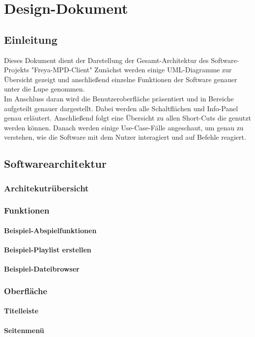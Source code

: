 \chapter{Design-Dokument}
\section{Einleitung}
Dieses Dokument dient der Darstellung der Gesamt-Architektur des Software-Projekts "Freya-MPD-Client"
Zunächst werden einige UML-Diagramme zur Übersicht gezeigt und anschließend einzelne Funktionen der
Software genauer unter die Lupe genommen.\ \\
Im Anschluss daran wird die Benutzeroberfläche präsentiert und in Bereiche aufgeteilt genauer dargestellt.
Dabei werden alle Schaltflächen und Info-Panel genau erläutert.
Anschließend folgt eine Übersicht zu allen Short-Cuts die genutzt werden können.
Danach werden einige Use-Case-Fälle angeschaut, um genau zu verstehen, wie die Software mit dem Nutzer
interagiert und auf Befehle reagiert.
\section{Softwarearchitektur}
\subsection{Architekutrübersicht}
\subsection{Funktionen}
\subsubsection{Beispiel-Abspielfunktionen}
\subsubsection{Beispiel-Playlist erstellen}
\subsubsection{Beispiel-Dateibrowser}
\subsection{Oberfläche}
\subsubsection{Titelleiste}
\subsubsection{Seitenmenü}
